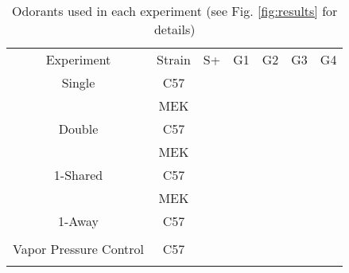\begin{table}
    \label{tab:design}
    \begin{tabular}{ c c c c c c c }
        Experiment & Strain & S+ & G1 & G2 & G3 & G4 \\ 
        Single & C57 &  &  &  &  &   \\ 
         & MEK &  &  &  &  &  \\ 
        Double & C57 &  &  &  &  &    \\ 
         & MEK &  &  &  &  &   \\ 
        1-Shared & C57 &  &  &  &  &  \\ 
         & MEK &  &  &  &  &   \\ 
        1-Away & C57 &  &  &  &  &    \\ 
         &  & &  &  &  &  \\ 
        Vapor Pressure Control & C57 &  &  &  &  &   \\ 
        &  &  &  &  &  &   \\ 
    \end{tabular}
    \caption{Odorants used in each experiment (see Fig. \ref{fig:results} for details)}
\end{table}